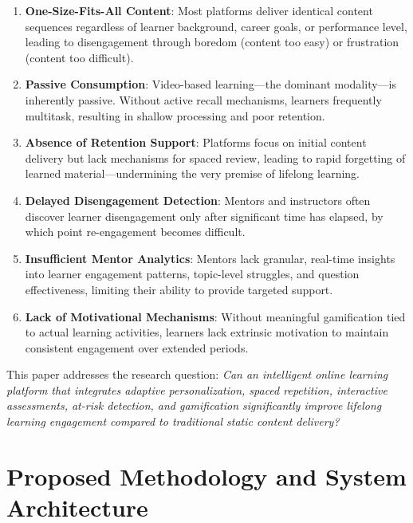 \documentclass[conference]{IEEEtran}
\begin{document}
\begin{enumerate}
    \item \textbf{One-Size-Fits-All Content}: Most platforms deliver identical content sequences regardless of learner background, career goals, or performance level, leading to disengagement through boredom (content too easy) or frustration (content too difficult).
    
    \item \textbf{Passive Consumption}: Video-based learning---the dominant modality---is inherently passive. Without active recall mechanisms, learners frequently multitask, resulting in shallow processing and poor retention.
    
    \item \textbf{Absence of Retention Support}: Platforms focus on initial content delivery but lack mechanisms for spaced review, leading to rapid forgetting of learned material---undermining the very premise of lifelong learning.
    
    \item \textbf{Delayed Disengagement Detection}: Mentors and instructors often discover learner disengagement only after significant time has elapsed, by which point re-engagement becomes difficult.
    
    \item \textbf{Insufficient Mentor Analytics}: Mentors lack granular, real-time insights into learner engagement patterns, topic-level struggles, and question effectiveness, limiting their ability to provide targeted support.
    
    \item \textbf{Lack of Motivational Mechanisms}: Without meaningful gamification tied to actual learning activities, learners lack extrinsic motivation to maintain consistent engagement over extended periods.
\end{enumerate}

This paper addresses the research question: \textit{Can an intelligent online learning platform that integrates adaptive personalization, spaced repetition, interactive assessments, at-risk detection, and gamification significantly improve lifelong learning engagement compared to traditional static content delivery?}

\section{Proposed Methodology and System Architecture}
\end{document}
